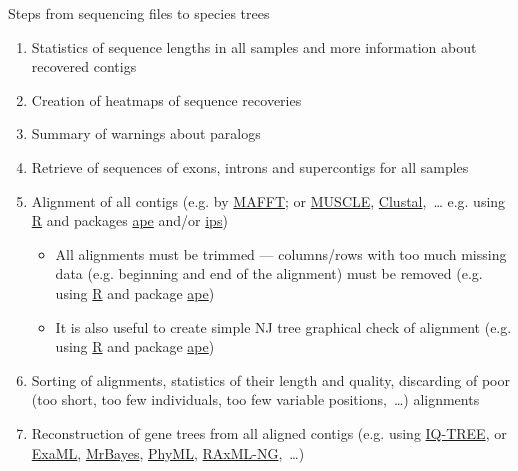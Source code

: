 \documentclass[compress, ucs, xelatex, 11pt, xcolor=x11names, aspectratio=169,
	hyperref={
		bookmarks=true,
		unicode=true,
		colorlinks=true,
		pdftitle={HybSeq course},
		plainpages=false,
		pdfauthor={Vojtech Zeisek},
		pdfsubject={Practical processing of HybSeq target enrichment sequencing data on computing grids like MetaCentrum},
		pdfcreator={XeLaTeX},
		pdfkeywords={BASH, command line, GNU, HybSeq, Linux, MetaCentrum, sequencing shell, target enrichment},
		linkcolor=Turquoise4, %
		anchorcolor=DodgerBlue4, %
		citecolor=DodgerBlue4, %
		filecolor=DodgerBlue4, %
		menucolor=Tan4, %
		urlcolor=DarkOliveGreen4, %
		pdftex},
	url={hyphens, lowtilde} %
	]{beamer}
\begin{document}
\begin{frame}[allowframebreaks]{Steps from sequencing files to species trees}
\begin{enumerate}
\begin{enumerate}
\begin{itemize}
				\item All contigs that pass the previous steps are concatenated into a \enquote{supercontig} and the exonerate search is repeated
			\end{itemize}
			\item Search for paralogs --- if SPAdes assembler generates multiple contigs that contain coding sequences representing 75\% of the length of the reference protein, HybPiper will print a warning for that gene
			\item Recovering of the individual sequences
			\item Statistics of the recovery
			\item Cleanup of temporal files (especially SPAdes produces huge amount of data unneeded for further processing)
		\end{enumerate}
		\item Statistics of sequence lengths in all samples and more information about recovered contigs
		\item Creation of heatmaps of sequence recoveries
		\item Summary of warnings about paralogs
		\item Retrieve of sequences of exons, introns and supercontigs for all samples
		\item Alignment of all contigs (e.g. by \href{https://mafft.cbrc.jp/alignment/software/}{MAFFT}; or \href{https://www.drive5.com/muscle/}{MUSCLE}, \href{http://www.clustal.org/}{Clustal},~\ldots{ }e.g. using \href{https://www.r-project.org/}{R} and packages \href{https://cran.r-project.org/package=ape}{ape} and/or \href{https://cran.r-project.org/package=ips}{ips})
		\begin{itemize}
			\item All alignments must be trimmed --- columns/rows with too much missing data (e.g. beginning and end of the alignment) must be removed (e.g. using \href{https://www.r-project.org/}{R} and package \href{https://cran.r-project.org/package=ape}{ape})
			\item It is also useful to create simple NJ tree graphical check of alignment (e.g. using \href{https://www.r-project.org/}{R} and package \href{https://cran.r-project.org/package=ape}{ape})
		\end{itemize}
		\item Sorting of alignments, statistics of their length and quality, discarding of poor (too short, too few individuals, too few variable positions,~\ldots) alignments
		\item Reconstruction of gene trees from all aligned contigs (e.g. using \href{http://www.iqtree.org/}{IQ-TREE}, or \href{https://github.com/stamatak/ExaML}{ExaML}, \href{https://nbisweden.github.io/MrBayes/}{MrBayes}, \href{https://github.com/stephaneguindon/phyml}{PhyML}, \href{https://github.com/amkozlov/raxml-ng}{RAxML-NG},~\ldots)

\end{enumerate}
\end{frame}
\end{document}
